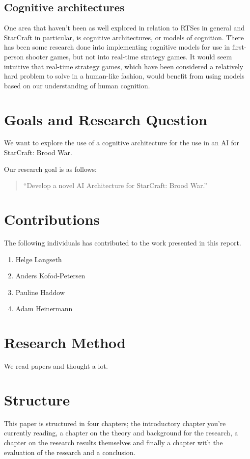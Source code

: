 \subsection{Cognitive architectures}
One area that haven't been as well explored in relation to RTSes in general and
StarCraft in particular, is cognitive architectures, or models of cognition.
There has been some research done into implementing cognitive models for use in
first-person shooter games, but not into real-time strategy games. It would seem
intuitive that real-time strategy games, which have been considered a relatively
hard problem to solve in a human-like fashion, would benefit from using models
based on our understanding of human cognition.

\section{Goals and Research Question}
We want to explore the use of a cognitive architecture for the use in an AI for
StarCraft: Brood War.

Our research goal is as follows:
\begin{quote}
 ``Develop a novel AI Architecture for StarCraft: Brood War.''
\end{quote}


\section{Contributions}
The following individuals has contributed to the work presented in this report.

\begin{enumerate}
 \item Helge Langseth
 \item Anders Kofod-Petersen
 \item Pauline Haddow
 \item Adam Heinermann
\end{enumerate}


\section{Research Method}
We read papers and thought a lot.


\section{Structure}
This paper is structured in four chapters; the introductory chapter you're
currently reading, a chapter on the theory and background for the research, a
chapter on the research results themselves and finally a chapter with the
evaluation of the research and a conclusion.